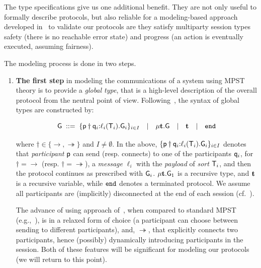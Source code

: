 The type specifications give us one additional benefit. They are not only useful to formally describe protocols, but also reliable for a modeling-based approach developed in~\cite{HuY17} to validate our protocols are they satisfy multiparty session types safety (there is no reachable error state) and progress (an action is eventually executed, assuming fairness).

The modeling process is done in two steps.

\begin{enumerate}[start=1,label={(\bfseries \arabic*)}]
	\item \textbf{The first step} in modeling the communications of a system using MPST theory is to provide a \emph{global type}, that is a high-level description of the overall protocol from the neutral point of view. Following~\cite{HuY17}, the syntax of global types are constructed by:
	
	\begin{equation}
	{\sf G} \; ::= \;
	\{{\sf p}\dagger{\sf q}_i{:}\ell_i({\mathsf T}_i).{\sf G}_i\}_{i\in I}  \quad | \quad 
	\mu \textbf{t}.{\sf G} \quad | \quad 
	\textbf{t} \quad | \quad
	\mathtt{end}
	\end{equation}
	
	\noindent
	where $\dagger\in\{\to, \twoheadrightarrow\}$ and $I\not=\emptyset$. 
	In the above, $\{{\sf p}\dagger{\sf q}_i{:}\ell_i({\mathsf T}_i).{\sf G}_i\}_{i\in I}$
	denotes that \emph{participant} ${\sf p}$ can send (resp. connects) to one of the participants ${\sf q}_i$, 
	for $\dagger=\to$ (resp. $\dagger=\twoheadrightarrow$), 
	a \emph{message} $\ell_i$ with the \emph{payload} of \emph{sort} ${\mathsf T}_i$, 
	and then the protocol continues as prescribed with ${\sf G}_i$.  
	$\mu \textbf{t}.{\sf G}_1$ is a recursive type, and $\textbf{t}$ is a recursive variable, 
	while $\mathtt{end}$ denotes a terminated protocol. We assume all participants are (implicitly) disconnected at the end of each session (cf.~\cite{HuY17}). 
	
	The advance of using approach of~\cite{HuY17}, when compared to standard MPST (e.g.,~\cite{HondaYC08}),
	is in a relaxed form of choice (a participant can choose between sending to different participants), 
	and, $\twoheadrightarrow$, that explicitly connects two participants, hence (possibly) dynamically 
	introducing participants in the session.
	Both of these features will be significant for modeling our protocols (we will return to this point).
	

\end{enumerate}
